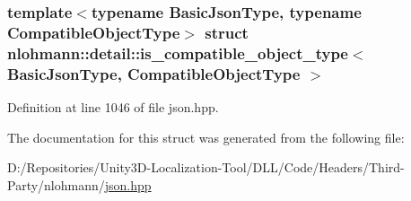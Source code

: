 \subsubsection*{template$<$typename Basic\+Json\+Type, typename Compatible\+Object\+Type$>$\newline
struct nlohmann\+::detail\+::is\+\_\+compatible\+\_\+object\+\_\+type$<$ Basic\+Json\+Type, Compatible\+Object\+Type $>$}



Definition at line 1046 of file json.\+hpp.



The documentation for this struct was generated from the following file\+:\begin{DoxyCompactItemize}
\item 
D\+:/\+Repositories/\+Unity3\+D-\/\+Localization-\/\+Tool/\+D\+L\+L/\+Code/\+Headers/\+Third-\/\+Party/nlohmann/\mbox{\hyperlink{json_8hpp}{json.\+hpp}}\end{DoxyCompactItemize}
